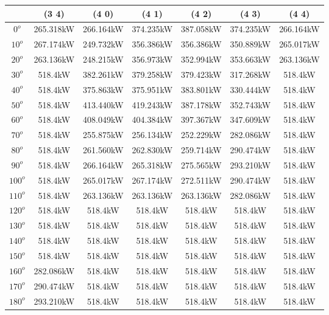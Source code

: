         \begin{table}[H]
        	\centering
        	\begin{tabular}{|c|c|c|c|c|c|c|} \hline
        			& (3 4)		& (4 0)		& (4 1)		& (4 2)		& (4 3)		& (4 4)		\\ \hline
		$0^o$	& 265.318kW	& 266.164kW	& 374.235kW	& 387.058kW	& 374.235kW	& 266.164kW	\\ \hline
		$10^o$	& 267.174kW	& 249.732kW	& 356.386kW	& 356.386kW	& 350.889kW	& 265.017kW	\\ \hline
		$20^o$	& 263.136kW	& 248.215kW	& 356.973kW	& 352.994kW	& 353.663kW	& 263.136kW	\\ \hline
		$30^o$	& 518.4kW	& 382.261kW	& 379.258kW	& 379.423kW	& 317.268kW	& 518.4kW	\\ \hline
		$40^o$	& 518.4kW	& 375.863kW	& 375.951kW	& 383.801kW	& 330.444kW	& 518.4kW	\\ \hline
		$50^o$	& 518.4kW	& 413.440kW	& 419.243kW	& 387.178kW	& 352.743kW	& 518.4kW	\\ \hline
		$60^o$	& 518.4kW	& 408.049kW	& 404.384kW	& 397.367kW	& 347.609kW	& 518.4kW	\\ \hline
		$70^o$	& 518.4kW	& 255.875kW	& 256.134kW	& 252.229kW	& 282.086kW	& 518.4kW	\\ \hline
		$80^o$	& 518.4kW	& 261.560kW	& 262.830kW	& 259.714kW	& 290.474kW	& 518.4kW	\\ \hline
		$90^o$	& 518.4kW	& 266.164kW	& 265.318kW	& 275.565kW	& 293.210kW	& 518.4kW	\\ \hline
		$100^o$	& 518.4kW	& 265.017kW	& 267.174kW	& 272.511kW	& 290.474kW	& 518.4kW	\\ \hline
		$110^o$	& 518.4kW	& 263.136kW	& 263.136kW	& 263.136kW	& 282.086kW	& 518.4kW	\\ \hline
		$120^o$	& 518.4kW	& 518.4kW	& 518.4kW	& 518.4kW	& 518.4kW	& 518.4kW	\\ \hline
		$130^o$	& 518.4kW	& 518.4kW	& 518.4kW	& 518.4kW	& 518.4kW	& 518.4kW	\\ \hline
		$140^o$	& 518.4kW	& 518.4kW	& 518.4kW	& 518.4kW	& 518.4kW	& 518.4kW	\\ \hline
		$150^o$	& 518.4kW	& 518.4kW	& 518.4kW	& 518.4kW	& 518.4kW	& 518.4kW	\\ \hline
		$160^o$	& 282.086kW	& 518.4kW	& 518.4kW	& 518.4kW	& 518.4kW	& 518.4kW	\\ \hline
		$170^o$	& 290.474kW	& 518.4kW	& 518.4kW	& 518.4kW	& 518.4kW	& 518.4kW	\\ \hline
		$180^o$	& 293.210kW	& 518.4kW	& 518.4kW	& 518.4kW	& 518.4kW	& 518.4kW	\\ \hline

\end{tabular}
\end{table}
